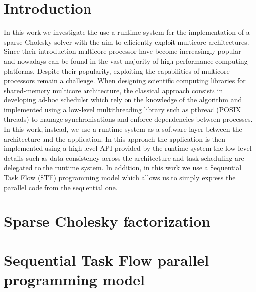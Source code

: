 \documentclass{article}
\begin{document}
\newpage
\setcounter{page}{1}

\section{Introduction} \label{sec:introduction}

In this work we investigate the use a runtime system for the
implementation of a sparse Cholesky solver with the aim to efficiently
exploit multicore architectures. Since their introduction multicore
processor have become increasingly popular and nowadays can be found
in the vast majority of high performance computing platforms. Despite
their popularity, exploiting the capabilities of multicore processors
remain a challenge. When designing scientific computing libraries for
shared-memory multicore architecture, the classical approach consists
in developing ad-hoc scheduler which rely on the knowledge of the
algorithm and implemented using a low-level multithreading library
such as pthread (POSIX threads) to manage synchronisations and enforce
dependencies between processes. In this work, instead, we use a
runtime system as a software layer between the architecture and the
application. In this approach the application is then implemented
using a high-level API provided by the runtime system the low level
details such as data consistency across the architecture and task
scheduling are delegated to the runtime system. In addition, in this
work we use a Sequential Task Flow (STF) programming model which
allows us to simply express the parallel code from the sequential one.

\section{Sparse Cholesky factorization}\label{sec:chol}
\setcounter{equation}{0}
\setcounter{table}{0}
\setcounter{figure}{0}

\section{Sequential Task Flow parallel programming model}\label{sec:runtime}
\end{document}
